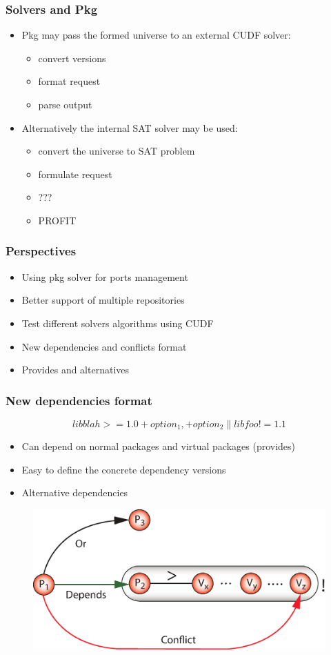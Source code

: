 \documentclass{beamer}
\begin{document}
\begin{frame}
\frametitle{Solvers and Pkg}
\begin{itemize}
  \item Pkg may pass the formed universe to an external CUDF solver:
  \begin{itemize}
    \item convert versions
    \item format request
    \item parse output
  \end{itemize}
  \item Alternatively the internal SAT solver may be used:
  \begin{itemize}
    \item convert the universe to SAT problem
    \item formulate request
    \item ???
    \item PROFIT
  \end{itemize} 
\end{itemize}
\end{frame}

\begin{frame}
\frametitle{Perspectives}

\begin{itemize}
  \item Using pkg solver for ports management
  \item Better support of multiple repositories
  \item Test different solvers algorithms using CUDF
  \item New dependencies and conflicts format
  \item Provides and alternatives
\end{itemize}
\end{frame}

\begin{frame}
\frametitle{New dependencies format}
\large{\[libblah >= 1.0 +option_1, +option_2 \| libfoo != 1.1\]}
\begin{itemize}
  \item Can depend on normal packages and virtual packages (provides)
  \item Easy to define the concrete dependency versions
  \item Alternative dependencies
\end{itemize}
\begin{figure}[h!]
  \centering
  \includegraphics[height=0.3\textheight]{q6.eps}
\end{figure}
\end{frame}
\end{document}
